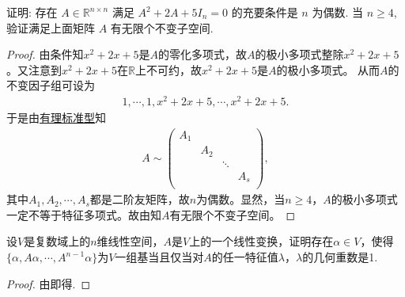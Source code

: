 \documentclass[../../main.tex]{subfiles}
\begin{document}
\begin{example}
证明: 存在 \( A \in \mathbb{R}^{n \times n} \) 满足 \( A^2 + 2A + 5I_n = 0 \) 的充要条件是 \( n \) 为偶数. 当 \( n \geqslant 4 \), 验证满足上面矩阵 \( A \) 有无限个不变子空间.
\end{example}
\begin{proof}
由条件知$x^2+2x+5$是$A$的零化多项式，故$A$的极小多项式整除$x^2+2x+5$。又注意到$x^2+2x+5$在$\mathbb{R}$上不可约，故$x^2+2x+5$是$A$的极小多项式。
从而$A$的不变因子组可设为
\begin{align*}
1,\cdots ,1,x^2+2x+5,\cdots ,x^2+2x+5.
\end{align*}
于是由\hyperref[theorem:有理标准型核心定理]{有理标准型}知
\begin{align*}
A\sim \begin{pmatrix}
A_1&		&		&		\\
&		A_2&		&		\\
&		&		\ddots&		\\
&		&		&		A_s\\
\end{pmatrix},
\end{align*}
其中$A_1,A_2,\cdots ,A_s$都是二阶友矩阵，故$n$为偶数。显然，当$n\geqslant 4$，$A$的极小多项式一定不等于特征多项式。故由知$A$有无限个不变子空间。
\end{proof}

\begin{example}
设\( V \)是复数域上的\( n \)维线性空间，\( A \)是\( V \)上的一个线性变换，证明存在\( \alpha \in V \)，使得\( \{ \alpha, A\alpha, \cdots, A^{n-1}\alpha \} \)为\( V \)一组基当且仅当对\( A \)的任一特征值\( \lambda \)，\( \lambda \)的几何重数是1.
\end{example}
\begin{proof}
由即得.
\end{proof}
\end{document}
